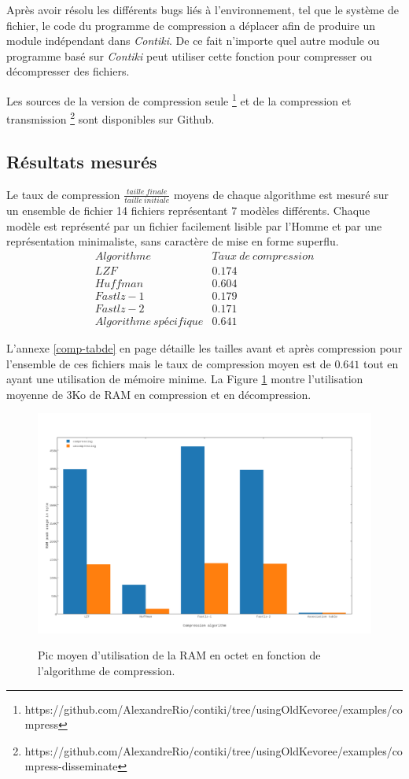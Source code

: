 Après avoir résolu les différents bugs liés à l'environnement, tel que le système de fichier, le code du programme de compression a déplacer afin de produire un module indépendant dans \emph{Contiki}. De ce fait n'importe quel autre module ou programme basé sur \emph{Contiki} peut utiliser cette fonction pour compresser ou décompresser des fichiers.

Les sources de la version de compression seule \footnote{https://github.com/AlexandreRio/contiki/tree/usingOldKevoree/examples/compress} et de la compression et transmission \footnote{https://github.com/AlexandreRio/contiki/tree/usingOldKevoree/examples/compress-disseminate} sont disponibles sur Github.

\subsection{Résultats mesurés}

Le taux de compression $\frac{taille~finale}{taille~initiale}$ moyens de chaque algorithme est mesuré sur un ensemble de fichier 14 fichiers représentant 7 modèles différents. Chaque modèle est représenté par un fichier facilement lisible par l'Homme et par une représentation minimaliste, sans caractère de mise en forme superflu.
\[
\begin{array}{lc}
Algorithme & Taux~de~compression \\
LZF & 0.174 \\
Huffman & 0.604 \\
Fastlz-1 & 0.179 \\
Fastlz-2 & 0.171 \\
Algorithme~spécifique& 0.641
\end{array}
\]

L'annexe \ref{comp-tabde} en page \pageref{comp-tabde} détaille les tailles avant et après compression pour l'ensemble de ces fichiers mais le taux de compression moyen est de $0.641$ tout en ayant une utilisation de mémoire minime. La Figure \ref{comp-memory} montre l'utilisation moyenne de 3Ko de RAM en compression et en décompression.

\begin{figure}[ht!]
\centering
\includegraphics[scale=0.4]{images/comp-memory.png}
\label{comp-memory}
\caption{Pic moyen d'utilisation de la RAM en octet en fonction de l'algorithme de compression.}
\end{figure}

